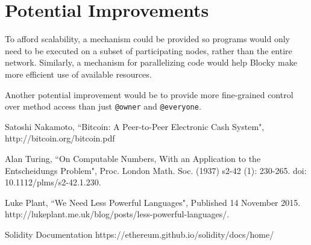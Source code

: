 \documentclass[letterpaper]{article}
\begin{document}
\section{Potential Improvements}
To afford scalability, a mechanism could be provided so programs would only need to be executed on a subset of participating nodes, rather than the entire network. Similarly, a mechanism for parallelizing code would help Blocky make more efficient use of available resources.

Another potential improvement would be to provide more fine-grained control over method access than just \texttt{@owner} and \texttt{@everyone}.
\begin{thebibliography}{9}

  Satoshi Nakamoto,
  ``Bitcoin: A Peer-to-Peer Electronic Cash System",
  http://bitcoin.org/bitcoin.pdf
  
  Alan Turing,
  ``On Computable Numbers, With an Application to the Entscheidungs Problem",
  Proc. London Math. Soc. (1937) s2-42 (1): 230-265.
  doi: 10.1112/plms/s2-42.1.230.
  
  Luke Plant,
  ``We Need Less Powerful Languages",
  Published 14 November 2015.
  http://lukeplant.me.uk/blog/posts/less-powerful-languages/.
  
  Solidity Documentation
  https://ethereum.github.io/solidity/docs/home/

\end{thebibliography}
  
\end{document}
